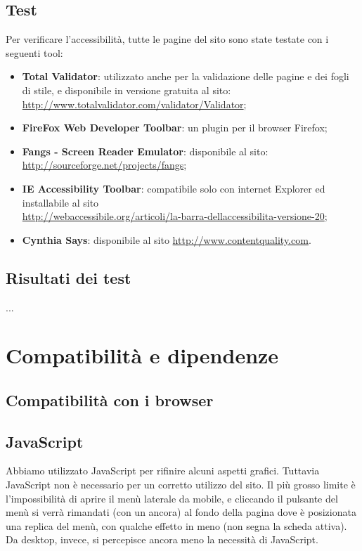 \documentclass[12pt]{article}
\begin{document}
	\subsection{Test}
	Per verificare l'accessibilità, tutte le pagine del sito sono state testate con i seguenti tool:
	\begin{itemize}
		\item \textbf{Total Validator}: utilizzato anche per la validazione delle pagine e dei fogli di stile, e disponibile in versione gratuita al sito: 
		\url{http://www.totalvalidator.com/validator/Validator};
		\item \textbf{FireFox Web Developer Toolbar}: un plugin per il browser Firefox;
		\item \textbf{Fangs - Screen Reader Emulator}: disponibile al sito: \url{http://sourceforge.net/projects/fangs};
		\item \textbf{IE Accessibility Toolbar}: compatibile solo con internet Explorer ed installabile al sito\\ \url{http://webaccessibile.org/articoli/la-barra-dellaccessibilita-versione-20};
		\item \textbf{Cynthia Says}: disponibile al sito \url{http://www.contentquality.com}.
	\end{itemize}

	\subsection{Risultati dei test}
	...
	
	\section{Compatibilità e dipendenze}
	\subsection{Compatibilità con i browser}
	
	\subsection{JavaScript}
	Abbiamo utilizzato JavaScript per rifinire alcuni aspetti grafici. Tuttavia JavaScript non è necessario per un corretto utilizzo del sito. Il più grosso limite è l'impossibilità di aprire il menù laterale da mobile, e cliccando il pulsante del menù si verrà rimandati (con un ancora) al fondo della pagina dove è posizionata una replica del menù, con qualche effetto in meno (non segna la scheda attiva). Da desktop, invece, si percepisce ancora meno la necessità di JavaScript.
	
\end{document}

